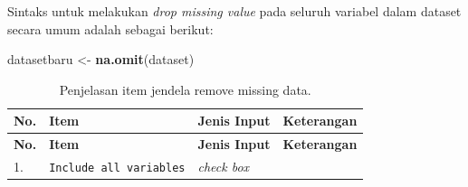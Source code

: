\documentclass[12pt,]{krantz}
\newenvironment{Shaded}{\begin{snugshade}}{\end{snugshade}}
\newcommand{\KeywordTok}[1]{\textcolor[rgb]{0.13,0.29,0.53}{\textbf{#1}}}
\newcommand{\NormalTok}[1]{#1}
\newcommand{\StringTok}[1]{\textcolor[rgb]{0.31,0.60,0.02}{#1}}
\begin{document}
Sintaks untuk melakukan \emph{drop missing value} pada seluruh variabel dalam dataset secara umum adalah sebagai berikut:

\begin{Shaded}
\begin{Highlighting}[]
\NormalTok{datasetbaru <-}\StringTok{ }\KeywordTok{na.omit}\NormalTok{(dataset)}
\end{Highlighting}
\end{Shaded}

\begin{longtable}[]{@{}llll@{}}
\caption{\label{tab:missing} Penjelasan item jendela remove missing data.}\tabularnewline
\toprule
\begin{minipage}[b]{0.04\columnwidth}\raggedright
\textbf{No.}\strut
\end{minipage} & \begin{minipage}[b]{0.14\columnwidth}\raggedright
\textbf{Item}\strut
\end{minipage} & \begin{minipage}[b]{0.09\columnwidth}\raggedright
\textbf{Jenis Input}\strut
\end{minipage} & \begin{minipage}[b]{0.61\columnwidth}\raggedright
\textbf{Keterangan}\strut
\end{minipage}\tabularnewline
\midrule
\endfirsthead
\toprule
\begin{minipage}[b]{0.04\columnwidth}\raggedright
\textbf{No.}\strut
\end{minipage} & \begin{minipage}[b]{0.14\columnwidth}\raggedright
\textbf{Item}\strut
\end{minipage} & \begin{minipage}[b]{0.09\columnwidth}\raggedright
\textbf{Jenis Input}\strut
\end{minipage} & \begin{minipage}[b]{0.61\columnwidth}\raggedright
\textbf{Keterangan}\strut
\end{minipage}\tabularnewline
\midrule
\endhead
\begin{minipage}[t]{0.04\columnwidth}\raggedright
1.\strut
\end{minipage} & \begin{minipage}[t]{0.14\columnwidth}\raggedright
\texttt{Include\ all\ variables}\strut
\end{minipage} & \begin{minipage}[t]{0.09\columnwidth}\raggedright
\emph{check box}\strut
\end{minipage} & \begin{minipage}[t]{0.61\columnwidth}\raggedright

\end{minipage}
\end{longtable}
\end{document}
